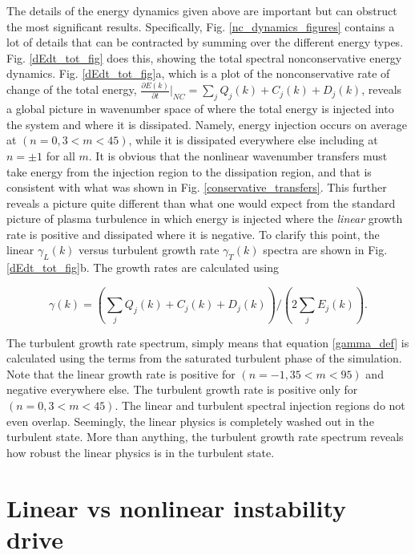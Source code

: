\documentclass[twocolumn,showpacs,preprintnumbers,amsmath,amssymb]{revtex4}
\def\beq{\begin{equation}}
\def\eeq{\end{equation}}
\newcommand{\pdiff}[2]{\frac{\partial#1}{\partial#2}}
\begin{document}
The details of the energy dynamics given above are important but can obstruct the most significant results. Specifically, Fig. \ref{nc_dynamics_figures} contains a lot of details
that can be contracted by summing over the different energy types.
Fig. \ref{dEdt_tot_fig} does this, showing the total spectral nonconservative energy dynamics.
Fig. \ref{dEdt_tot_fig}a, which is a plot of the nonconservative rate of change of the total energy, $ \pdiff{E(k)}{t} \big|_{NC} = \sum_j Q_j(k) + C_j(k) + D_j(k)$, 
reveals a global picture in wavenumber space of
where the total energy is injected into the system and where it is dissipated. Namely, energy injection occurs on average at $(n=0, 3<m<45)$, 
while it is dissipated everywhere else including at $n=\pm 1$ for all $m$. It is obvious that the nonlinear wavenumber transfers must take energy from the injection region to the dissipation
region, and that is consistent with what was shown in Fig. \ref{conservative_transfers}.
This further reveals a picture quite different than what one would expect from the standard picture of plasma turbulence in which energy is 
injected where the \emph{linear} growth rate is positive and dissipated
where it is negative. To clarify this point, the linear $\gamma_L(k)$ versus turbulent growth rate $\gamma_{T}(k)$ spectra are shown in Fig. \ref{dEdt_tot_fig}b. The growth rates are calculated using

\beq
\label{gamma_def}
\gamma(k) = \left( \sum_j Q_j(k) + C_j(k) + D_j(k) \right)/\left( 2 \sum_j E_j(k) \right).
\eeq

The turbulent growth rate spectrum, simply means that equation \ref{gamma_def} is calculated using the terms from the saturated turbulent phase of the simulation.
Note that the linear growth rate is positive for $(n=-1, 35<m<95)$ and negative everywhere else. The turbulent growth rate is positive only
for $(n=0, 3<m<45)$. The linear and turbulent spectral injection regions do not even overlap. Seemingly, the linear physics is completely washed out in the turbulent state. 
More than anything, the turbulent growth rate spectrum reveals how robust the linear physics is in the turbulent state.


\section{Linear vs nonlinear instability drive}
\end{document}
